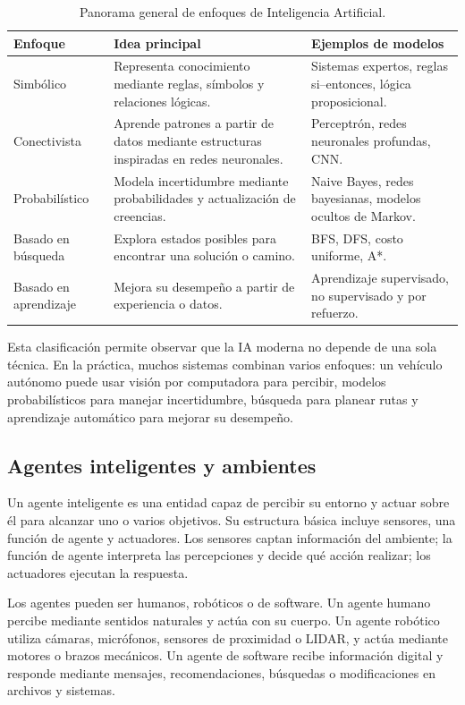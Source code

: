 \begin{table}[h!]
\centering
\small
\renewcommand{\arraystretch}{1.25}
\begin{tabularx}{\textwidth}{L{3.4cm} Y Y}
\toprule
\textbf{Enfoque} & \textbf{Idea principal} & \textbf{Ejemplos de modelos} \\
\midrule
Simbólico & Representa conocimiento mediante reglas, símbolos y relaciones lógicas. & Sistemas expertos, reglas si--entonces, lógica proposicional. \\
Conectivista & Aprende patrones a partir de datos mediante estructuras inspiradas en redes neuronales. & Perceptrón, redes neuronales profundas, CNN. \\
Probabilístico & Modela incertidumbre mediante probabilidades y actualización de creencias. & Naive Bayes, redes bayesianas, modelos ocultos de Markov. \\
Basado en búsqueda & Explora estados posibles para encontrar una solución o camino. & BFS, DFS, costo uniforme, A*. \\
Basado en aprendizaje & Mejora su desempeño a partir de experiencia o datos. & Aprendizaje supervisado, no supervisado y por refuerzo. \\
\bottomrule
\end{tabularx}
\caption{Panorama general de enfoques de Inteligencia Artificial.}
\label{tab:enfoques}
\end{table}

Esta clasificación permite observar que la IA moderna no depende de una sola técnica. En la práctica, muchos sistemas combinan varios enfoques: un vehículo autónomo puede usar visión por computadora para percibir, modelos probabilísticos para manejar incertidumbre, búsqueda para planear rutas y aprendizaje automático para mejorar su desempeño.

\subsection{Agentes inteligentes y ambientes}

Un agente inteligente es una entidad capaz de percibir su entorno y actuar sobre él para alcanzar uno o varios objetivos. Su estructura básica incluye sensores, una función de agente y actuadores. Los sensores captan información del ambiente; la función de agente interpreta las percepciones y decide qué acción realizar; los actuadores ejecutan la respuesta.

Los agentes pueden ser humanos, robóticos o de software. Un agente humano percibe mediante sentidos naturales y actúa con su cuerpo. Un agente robótico utiliza cámaras, micrófonos, sensores de proximidad o LIDAR, y actúa mediante motores o brazos mecánicos. Un agente de software recibe información digital y responde mediante mensajes, recomendaciones, búsquedas o modificaciones en archivos y sistemas.

